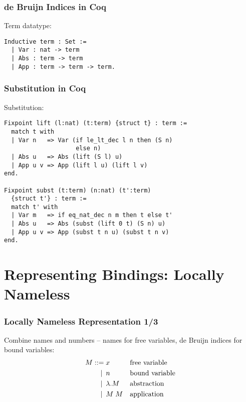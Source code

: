 \documentclass[notheorems]{beamer}
\begin{document}
\begin{frame}[fragile]

  \frametitle{de Bruijn Indices in Coq}

  Term datatype:
  \begin{lstlisting}
Inductive term : Set :=
  | Var : nat -> term
  | Abs : term -> term
  | App : term -> term -> term.
  \end{lstlisting}

\end{frame}


\begin{frame}[fragile]

  \frametitle{Substitution in Coq}

  Substitution:
  \begin{lstlisting}
Fixpoint lift (l:nat) (t:term) {struct t} : term :=
  match t with
  | Var n   => Var (if le_lt_dec l n then (S n)
                    else n)
  | Abs u   => Abs (lift (S l) u)
  | App u v => App (lift l u) (lift l v)
end.

Fixpoint subst (t:term) (n:nat) (t':term)
  {struct t'} : term :=
  match t' with
  | Var m   => if eq_nat_dec n m then t else t'
  | Abs u   => Abs (subst (lift 0 t) (S n) u)
  | App u v => App (subst t n u) (subst t n v)
end.
  \end{lstlisting}

\end{frame}


\section{Representing Bindings: Locally Nameless}




\begin{frame}

  \frametitle{Locally Nameless Representation 1/3}

  Combine names and numbers -- names for free variables, de Bruijn indices for bound variables:
  \begin{align*}
    M ::=             &\; x
    && \text{free variable} \\
    \llap{\textbar\:} &\; n
    && \text{bound variable} \\
    \llap{\textbar\:} &\; \lambda .M
    && \text{abstraction} \\
    \llap{\textbar\:} &\; M \; M
    && \text{application} \\
  \end{align*}


\end{frame}
\end{document}
